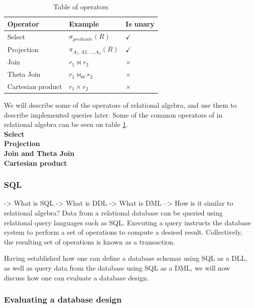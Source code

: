 \begin{table}[h]
    \centering
    \begin{tabular}{|lll|}
    \hline 
    \multicolumn{1}{|l|}{\textbf{Operator}}          & \multicolumn{1}{l|}{\textbf{Example}}   & \multicolumn{1}{l|}{\textbf{Is unary}}      \\ \hline
    \multicolumn{1}{|l|}{Select}                     & \multicolumn{1}{l|}{$\sigma_{predicate}(R)$}             & \multicolumn{1}{l|}{$\checkmark$}           \\ \hline
    \multicolumn{1}{|l|}{Projection}                 & \multicolumn{1}{l|}{$\pi_{A_1, A2,...,A_n}(R)$}             & \multicolumn{1}{l|}{$\checkmark$}           \\ \hline
    \multicolumn{1}{|l|}{Join}                       & \multicolumn{1}{l|}{$r_1 \Join r_2$}             & \multicolumn{1}{l|}{$\times$}           \\ \hline
    \multicolumn{1}{|l|}{Theta Join}                 & \multicolumn{1}{l|}{$r_1 \Join_\Theta r_2$}             & \multicolumn{1}{l|}{$\times$}           \\ \hline
    \multicolumn{1}{|l|}{Cartesian product}          & \multicolumn{1}{l|}{$r_1\times r_2$}              & \multicolumn{1}{l|}{$\times$}            \\ \hline
    \end{tabular}
    \caption{Table of operators}
    \label{Relational algebra operators}
\end{table}

We will describe some of the operators of relational algebra, and use them to describe implemented queries later.
Some of the common operators of in relational algebra can be seen on table \ref{Relational algebra operators}.\\
\textbf{Select}\\
\textbf{Projection}\\
\textbf{Join and Theta Join}\\
\textbf{Cartesian product}\\



\subsubsection{SQL}\label{sec:SQL}
-> What is SQL
-> What is DDL
-> What is DML
   --> How is it similar to relational algebra?
Data from a relational database can be queried using relational query languages such as SQL.
Executing a query instructs the database system to perform a set of operations to compute a desired result. Collectively, the resulting set of operations is known as a transaction.

Having established how one can define a database schemas using SQL as a DLL, as well as query data from the database using SQL as a DML, we will now discuss how one can evaluate a database design.
\subsubsection*{Evaluating a database design}

